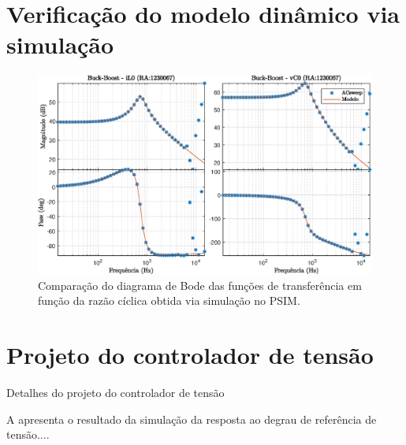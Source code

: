 									
\section{Verificação do modelo dinâmico via simulação}


\begin{figure}[!ht]
	\centering
	\includegraphics[width=1\linewidth]{Figs/Buck-BoostACSweep}
		\caption{Comparação do diagrama de Bode das funções de transferência em função da razão cíclica obtida via simulação no PSIM.}
	\label{fig:Buck-BoostACSweep}
\end{figure}






\section{Projeto do controlador de tensão}
Detalhes do projeto do controlador de tensão







A  apresenta o resultado da simulação da resposta ao degrau de referência de tensão....

